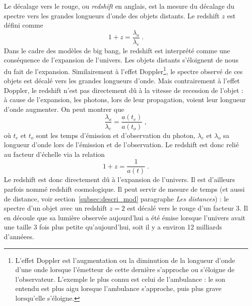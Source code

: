 Le décalage vers le rouge, ou \emph{redshift} en anglais, est la mesure du décalage du spectre vers les grandes longueurs d'onde des objets distants. Le redshift $z$ est défini comme 
\begin{equation}
  \label{eq:redshift}
  1 + z = \frac{\lambda_o}{\lambda_e}  \; .
\end{equation}
Dans le cadre des modèles de big bang, le redshift est interprété comme une conséquence de l'expansion de l'univers.
Les objets distants s'éloignent de nous du fait de l'expansion. Similairement à l'effet Doppler\footnote{L'effet Doppler est l'augmentation ou la diminution de la longueur d'onde d'une onde lorsque l'émetteur de cette dernière s'approche ou s'éloigne de l'observateur. L'exemple le plus connu est celui de l'ambulance : le son entendu est plus aigu lorsque l'ambulance s'approche, puis plus grave lorsqu'elle s'éloigne.}, le spectre observé de ces objets est décalé vers les grandes longueurs d'onde.
Mais contrairement à l'effet Doppler, le redshift n'est pas directement dû à la vitesse de recession de l'objet :
à cause de l'expansion, les photons, lors de leur propagation, voient leur longueur d'onde augmenter.
On peut montrer que
\begin{equation}
  \frac{\lambda_o}{\lambda_e} = \frac{a(t_e)}{a(t_o)}  \; ,
\end{equation}
où $t_e$ et $t_o$ sont les temps d'émission et d'observation du photon, $\lambda_{e}$  et $\lambda_{o}$ sa longueur d'onde lors de l'émission et de l'observation. Le redshift est donc relié au facteur d'échelle via la relation
\begin{equation}
  \label{eq:redshift2}
  1 + z = \frac{1}{a(t)} \; .
\end{equation} 
Le redshift est donc directement dû à l'expansion de l'univers. Il est d'ailleurs parfois nommé redshift cosmologique. Il peut servir de mesure de temps (et aussi de distance, voir section~\ref{subsec:descri_mod} paragraphe \emph{Les distances}) : le spectre d'un objet avec un redshift $z=2$ est décalé vers le rouge d'un facteur 3. Il en découle que sa lumière observée aujourd'hui a été émise lorsque l'univers avait une taille 3 fois plus petite qu'aujourd'hui, soit il y a environ 12 milliards d'annéees.


